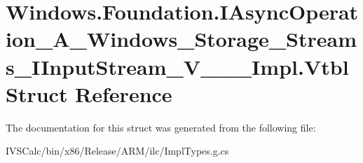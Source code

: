 \hypertarget{struct_windows_1_1_foundation_1_1_i_async_operation___a___windows___storage___streams___i_input_stream___v_______impl_1_1_vtbl}{}\section{Windows.\+Foundation.\+I\+Async\+Operation\+\_\+\+A\+\_\+\+Windows\+\_\+\+Storage\+\_\+\+Streams\+\_\+\+I\+Input\+Stream\+\_\+\+V\+\_\+\+\_\+\+\_\+\+Impl.\+Vtbl Struct Reference}
\label{struct_windows_1_1_foundation_1_1_i_async_operation___a___windows___storage___streams___i_input_stream___v_______impl_1_1_vtbl}


The documentation for this struct was generated from the following file\+:\begin{DoxyCompactItemize}
\item 
I\+V\+S\+Calc/bin/x86/\+Release/\+A\+R\+M/ilc/Impl\+Types.\+g.\+cs\end{DoxyCompactItemize}

